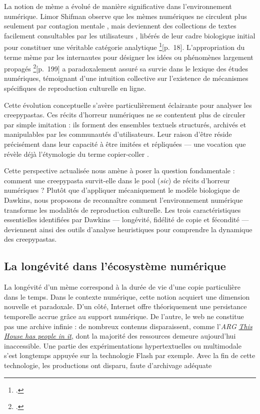 \documentclass[12pt,a4paper,oneside,titlepage]{book} %
\begin{document}
La notion de mème a évolué de manière significative dans l'environnement numérique. Limor Shifman observe que les mèmes numériques ne circulent plus seulement par \og contagion mentale \fg{}, mais deviennent des \og collections de textes facilement consultables par les utilisateurs \fg{}, libérés de leur cadre biologique initial pour constituer une véritable catégorie analytique \footcite{shifman_cultural_2014}[p.~18]. L'appropriation du terme \og mème \fg{} par les internautes pour désigner les \og idées ou phénomènes largement propagés \fg{} \footcite{knobel_online_2007}[p.~199] a paradoxalement assuré sa survie dans le lexique des études numériques, témoignant d'une intuition collective sur l'existence de mécanismes spécifiques de reproduction culturelle en ligne.

Cette évolution conceptuelle s'avère particulièrement éclairante pour analyser les creepypastas. Ces récits d'horreur numériques ne se contentent plus de circuler par simple imitation : ils forment des ensembles textuels structurés, archivés et manipulables par les communautés d'utilisateurs. Leur raison d'être réside précisément dans leur capacité à être imitées et répliquées --- une vocation que révèle déjà l'étymologie du terme \og copier-coller \fg{}.

Cette perspective actualisée nous amène à poser la question fondamentale : comment une creepypasta survit-elle dans le \og pool \fg{} (\textit{sic}) de récits d'horreur numériques ? Plutôt que d'appliquer mécaniquement le modèle biologique de Dawkins, nous proposons de reconnaître comment l'environnement numérique transforme les modalités de reproduction culturelle. Les trois caractéristiques essentielles identifiées par Dawkins --- longévité, fidélité de copie et fécondité --- deviennent ainsi des outils d'analyse heuristiques pour comprendre la dynamique des creepypastas.

\subsection{La longévité dans l'écosystème numérique}


La longévité d'un mème correspond à la durée de vie d'une copie particulière dans le temps. Dans le contexte numérique, cette notion acquiert une dimension nouvelle et paradoxale. D'un côté, Internet offre théoriquement une persistance temporelle accrue grâce au support numérique. De l'autre, le web ne constitue pas une archive infinie : de nombreux contenus disparaissent, comme l'\emph{ARG} \href{https://www.youtube.com/watch?v=x-pj8OtyO2I}{\emph{This House has people in it}}, dont la majorité des ressources demeure aujourd'hui inaccessible. Une partie des expérimentations hypertextuelles ou multimodale s'est longtemps appuyée sur la technologie Flash par exemple. Avec la fin de cette technologie, les productions ont disparu, faute d'archivage adéquate
\end{document}

